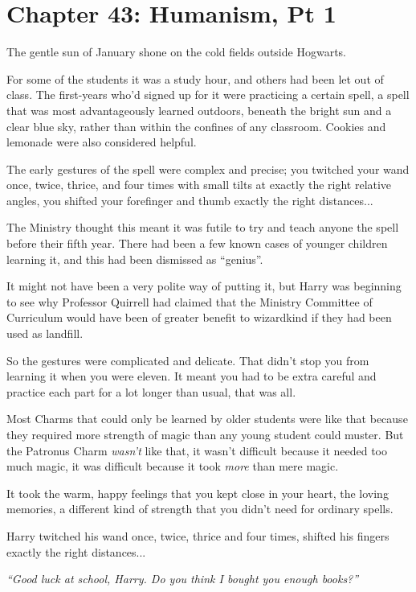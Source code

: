 \chapter{Chapter 43: Humanism, Pt 1}
The gentle sun of January shone on the cold fields outside Hogwarts.

For some of the students it was a study hour, and others had been let
out of class. The first-years who'd signed up for it were practicing a
certain spell, a spell that was most advantageously learned outdoors,
beneath the bright sun and a clear blue sky, rather than within the
confines of any classroom. Cookies and lemonade were also considered
helpful.

The early gestures of the spell were complex and precise; you twitched
your wand once, twice, thrice, and four times with small tilts at
exactly the right relative angles, you shifted your forefinger and thumb
exactly the right distances...

The Ministry thought this meant it was futile to try and teach anyone
the spell before their fifth year. There had been a few known cases of
younger children learning it, and this had been dismissed as ``genius''.

It might not have been a very polite way of putting it, but Harry was
beginning to see why Professor Quirrell had claimed that the Ministry
Committee of Curriculum would have been of greater benefit to wizardkind
if they had been used as landfill.

So the gestures were complicated and delicate. That didn't stop you from
learning it when you were eleven. It meant you had to be extra careful
and practice each part for a lot longer than usual, that was all.

Most Charms that could only be learned by older students were like that
because they required more strength of magic than any young student
could muster. But the Patronus Charm \emph{wasn't} like that, it wasn't
difficult because it needed too much magic, it was difficult because it
took \emph{more} than mere magic.

It took the warm, happy feelings that you kept close in your heart, the
loving memories, a different kind of strength that you didn't need for
ordinary spells.

Harry twitched his wand once, twice, thrice and four times, shifted his
fingers exactly the right distances...

\emph{``Good luck at school, Harry. Do you think I bought you enough
books?''}

